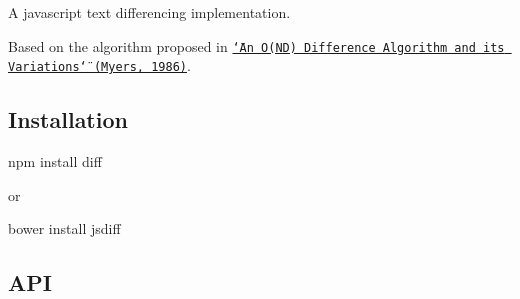 \href{http://travis-ci.org/kpdecker/jsdiff}{\tt } \href{https://saucelabs.com/u/jsdiff}{\tt }

A javascript text differencing implementation.

Based on the algorithm proposed in \href{http://citeseerx.ist.psu.edu/viewdoc/summary?doi=10.1.1.4.6927}{\tt \char`\"{}\+An O(\+N\+D) Difference Algorithm and its Variations\char`\"{} (Myers, 1986)}.

\subsection*{Installation}

\begin{DoxyVerb}npm install diff
\end{DoxyVerb}


or \begin{DoxyVerb}bower install jsdiff
\end{DoxyVerb}


\subsection*{A\+PI}


